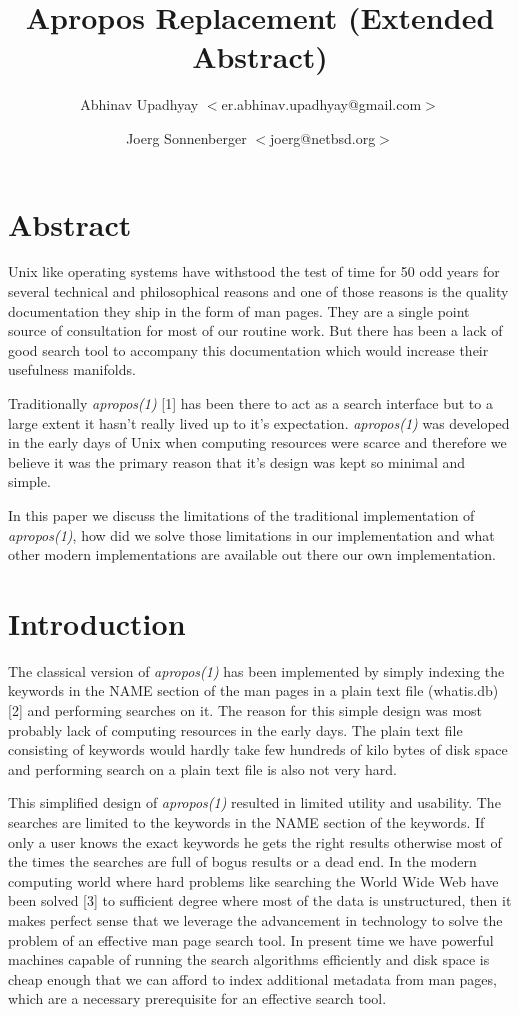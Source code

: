\documentclass[titlepage, a4paper, 12pt]{article}
\title{Apropos Replacement \newline
(Extended  Abstract)}
\author{Abhinav Upadhyay $<$er.abhinav.upadhyay@gmail.com$>$ \and 
Joerg Sonnenberger $<$joerg@netbsd.org$>$}
\begin{document}
\maketitle
\section{Abstract}
Unix like operating systems have withstood the test of time for 50 odd years for
several technical and philosophical reasons and one of those reasons is the
quality documentation they ship in the form of man pages. They are a single point
source of consultation for most of our routine work. But there has been a lack of
good search tool to accompany this documentation which would increase their
usefulness manifolds.

Traditionally \textit{apropos(1)} [1] has been there to act as a search
interface but to a
large extent it hasn't really lived up to it's expectation. \textit{\textit{apropos(1)}} was
developed in the early days of Unix when computing resources were scarce and
therefore we believe it was the primary reason that it's design was kept so
minimal and simple.

In this paper we discuss the limitations of the traditional implementation of
\textit{apropos(1)}, how did we solve those limitations in our implementation
and what other modern implementations are available out there
our own implementation.
\section{Introduction}
The classical version of \textit{apropos(1)} has been implemented by simply
indexing the keywords in the NAME section of the man pages in a plain text file
(whatis.db) [2]
and performing searches on it. The reason for this simple design was most
probably lack of computing resources in the early days. The plain text file
consisting of keywords would hardly take few hundreds of kilo bytes of disk space
and performing search on a plain text file is also not very hard.

This simplified design of \textit{apropos(1)} resulted in limited utility and usability.
The searches are limited to the keywords in the NAME section of the keywords. If
only a user knows the exact keywords he gets the right results otherwise most of
the times the searches are full of bogus results or a dead end. In the modern
computing world where hard problems like searching the World Wide Web have been
solved [3] to sufficient degree where most of the data is unstructured, then it
makes perfect sense that we leverage the advancement in technology to solve the
problem of an effective man page search tool. In present time we have
powerful machines capable of running the search algorithms efficiently and disk
space is cheap enough that we can afford to index additional metadata from man
pages, which are a necessary prerequisite for an effective search tool.
\end{document}

